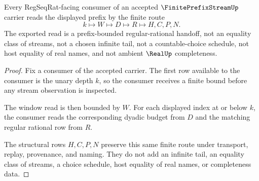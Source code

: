 \begin{theorem}
\label{thm:finite-prefix-stream-certificate-window-readback}
Every RegSeqRat-facing consumer of an accepted $\FinitePrefixStreamUp$ carrier reads the displayed prefix by the finite route
$$
k \longmapsto W \longmapsto D \longmapsto R \longmapsto H,C,P,N .
$$
The exported read is a prefix-bounded regular-rational handoff, not an equality class of streams, not a chosen infinite tail, not a countable-choice schedule, not host equality of real names, and not ambient $\RealUp$ completeness.
\end{theorem}
\begin{proof}
Fix a consumer of the accepted carrier. The first row available to the consumer is the unary depth $k$, so the consumer receives a finite bound before any stream observation is inspected.

The window read is then bounded by $W$. For each displayed index at or below $k$, the consumer reads the corresponding dyadic budget from $D$ and the matching regular rational row from $R$.

The structural rows $H,C,P,N$ preserve this same finite route under transport, replay, provenance, and naming. They do not add an infinite tail, an equality class of streams, a choice schedule, host equality of real names, or completeness data.
\end{proof}

